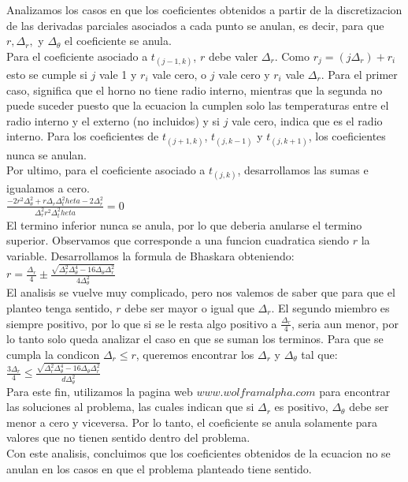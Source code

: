 Analizamos los casos en que los coeficientes obtenidos a partir de la discretizacion de las derivadas parciales asociados a cada punto se anulan, es decir, para que $r, \Delta_r,$ y $\Delta_\theta$ el coeficiente se anula. \\
Para el coeficiente asociado a $t_{(j-1, k)}$, $r$ debe valer $\Delta_r$. Como $r_j = (j \Delta_r) + r_i$ esto se cumple si $j$ vale 1 y $r_i$ vale cero, o $j$ vale cero y $r_i$ vale $\Delta_r$. Para el primer caso, significa que el horno no tiene radio interno, mientras que la segunda no puede suceder puesto que la ecuacion la cumplen solo las temperaturas entre el radio interno y el externo (no incluidos) y si $j$ vale cero, indica que es el radio interno.
Para los coeficientes de $t_{(j+1, k)}$, $t_{(j, k-1)}$ y $t_{(j, k+1)}$, los coeficientes nunca se anulan. \\
Por ultimo, para el coeficiente asociado a $t_{(j, k)}$, desarrollamos las sumas e igualamos a cero. \\
$\frac{-2r^2 \Delta^2_\theta + r \Delta_r \Delta^2_theta - 2 \Delta^2_r}{\Delta^2_r r^2 \Delta^2_theta} = 0$\\
El termino inferior nunca se anula, por lo que deberia anularse el termino superior. Observamos que corresponde a una funcion cuadratica siendo $r$ la variable. Desarrollamos la formula de Bhaskara obteniendo: \\
$r = \frac{\Delta_r}{4} \pm \frac{\sqrt{\Delta^2_r \Delta^4_\theta - 16 \Delta_\theta \Delta^2_r}}{4 \Delta^2_\theta}$ \\
El analisis se vuelve muy complicado, pero nos valemos de saber que para que el planteo tenga sentido, $r$ debe ser mayor o igual que $\Delta_r$.
El segundo miembro es siempre positivo, por lo que si se le resta algo positivo a $\frac{\Delta_r}{4}$, seria aun menor, por lo tanto solo queda analizar el caso en que se suman los terminos. Para que se cumpla la condicon $\Delta_r \leq r$, queremos encontrar los $\Delta_r$ y $\Delta_\theta$ tal que: \\
$\frac{3 \Delta_r}{4}  \leq \frac{\sqrt{\Delta^2_r \Delta^4_\theta - 16 \Delta_\theta \Delta^2_r}}{d \Delta^2_\theta} $ \\
Para este fin, utilizamos la pagina web $www.wolframalpha.com$ para encontrar las soluciones al problema, las cuales indican que si $\Delta_r$ es positivo, $\Delta_\theta$ debe ser menor a cero y viceversa. Por lo tanto, el coeficiente se anula solamente para valores que no tienen sentido dentro del problema. \\
Con este analisis, concluimos que los coeficientes obtenidos de la ecuacion no se anulan en los casos en que el problema planteado tiene sentido.
